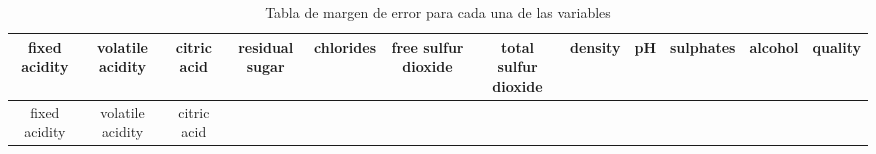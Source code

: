 \documentclass[
]{article}
\begin{document}
\begin{longtable}[]{@{}cccccccccccc@{}}
\caption{Tabla de margen de error para cada una de las
variables}\tabularnewline
\toprule
\begin{minipage}[b]{0.06\columnwidth}\centering
fixed acidity\strut
\end{minipage} & \begin{minipage}[b]{0.08\columnwidth}\centering
volatile acidity\strut
\end{minipage} & \begin{minipage}[b]{0.06\columnwidth}\centering
citric acid\strut
\end{minipage} & \begin{minipage}[b]{0.07\columnwidth}\centering
residual sugar\strut
\end{minipage} & \begin{minipage}[b]{0.05\columnwidth}\centering
chlorides\strut
\end{minipage} & \begin{minipage}[b]{0.09\columnwidth}\centering
free sulfur dioxide\strut
\end{minipage} & \begin{minipage}[b]{0.09\columnwidth}\centering
total sulfur dioxide\strut
\end{minipage} & \begin{minipage}[b]{0.04\columnwidth}\centering
density\strut
\end{minipage} & \begin{minipage}[b]{0.03\columnwidth}\centering
pH\strut
\end{minipage} & \begin{minipage}[b]{0.05\columnwidth}\centering
sulphates\strut
\end{minipage} & \begin{minipage}[b]{0.04\columnwidth}\centering
alcohol\strut
\end{minipage} & \begin{minipage}[b]{0.04\columnwidth}\centering
quality\strut
\end{minipage}\tabularnewline
\midrule
\endfirsthead
\toprule
\begin{minipage}[b]{0.06\columnwidth}\centering
fixed acidity\strut
\end{minipage} & \begin{minipage}[b]{0.08\columnwidth}\centering
volatile acidity\strut
\end{minipage} & \begin{minipage}[b]{0.06\columnwidth}\centering
citric acid\strut

\end{minipage}
\end{longtable}
\end{document}
